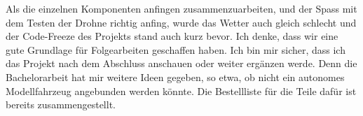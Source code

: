 Als die einzelnen Komponenten anfingen zusammenzuarbeiten, und der Spass mit dem Testen der Drohne richtig anfing, wurde das Wetter auch gleich schlecht und der Code-Freeze des Projekts stand auch kurz bevor. Ich denke, dass wir eine gute Grundlage für Folgearbeiten geschaffen haben. Ich bin mir sicher, dass ich das Projekt nach dem Abschluss anschauen oder weiter ergänzen werde.
Denn die Bachelorarbeit hat mir weitere Ideen gegeben, so etwa, ob nicht ein autonomes Modellfahrzeug angebunden werden könnte. Die Bestellliste für die Teile dafür ist bereits zusammengestellt.





